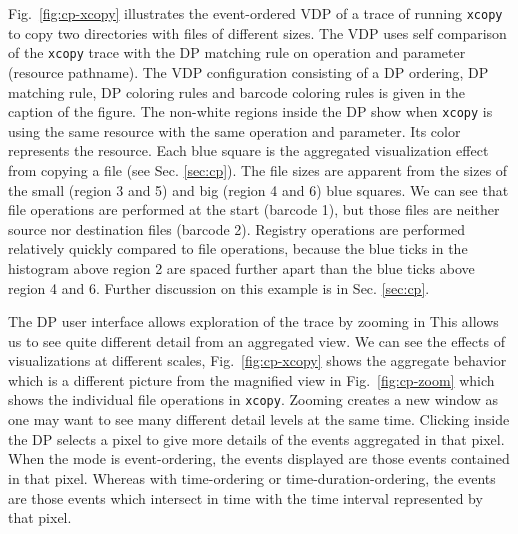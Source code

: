 
Fig.~\ref{fig:cp-xcopy} illustrates the event-ordered VDP
of a trace of running
{\tt xcopy} to copy two directories with files of different sizes.
The VDP uses self comparison of the {\tt xcopy} trace with
the DP matching rule on operation and parameter (resource pathname).
The VDP configuration consisting of a DP ordering, DP matching rule,
DP coloring rules and barcode coloring rules
is given in the caption of the figure.
The non-white regions inside the DP show when {\tt xcopy} is using the
same resource with the same operation and parameter.
Its color represents the resource.
Each blue square is the aggregated visualization effect from
copying a file (see Sec. \ref{sec:cp}).
The file sizes are apparent from the sizes of the small (region 3 and 5)
and big (region 4 and 6) blue squares.
We can see that file operations are performed at the start (barcode 1),
but those files are neither source nor destination files (barcode 2).
Registry operations are performed relatively
quickly compared to file operations,
because the blue ticks in the histogram above region 2 are spaced further apart
than the blue ticks above region 4 and 6.
Further discussion on this example is in Sec. \ref{sec:cp}.

The DP user interface allows exploration of the trace by zooming in
This allows us to see quite different detail from an aggregated view.
We can see the effects of visualizations at different scales,
Fig.~\ref{fig:cp-xcopy} shows the aggregate behavior which
is a different picture from the magnified view in
Fig.~\ref{fig:cp-zoom} which shows the individual file operations in {\tt xcopy}.
Zooming creates a new window as one may want to see many different
detail levels at the same time. Clicking inside the DP selects
a pixel to give more details of the events aggregated in that pixel. When
the mode is event-ordering, the events displayed are those events contained
in that pixel. Whereas with time-ordering or time-duration-ordering,
the events are those events which intersect in time with the time interval
represented by that pixel.

